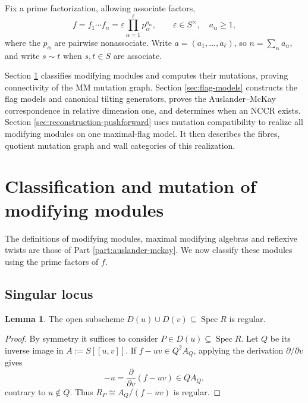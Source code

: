 \documentclass[a4paper,reqno]{amsart}
\DeclareMathOperator{\Spec}{Spec}
\theoremstyle{definition}
\newtheorem{Lem}[Thm]{Lemma}
\begin{document}
Fix a prime factorization, allowing associate factors,
\[
f=f_1\cdots f_n=\varepsilon\prod_{\alpha=1}^{\ell}p_\alpha^{a_\alpha},
\qquad \varepsilon\in S^\times,\quad a_\alpha\ge1,
\]
where the $p_\alpha$ are pairwise nonassociate. Write $a=(a_1,\ldots,a_\ell)$, so $n=\sum_\alpha a_\alpha$, and write $s\sim t$ when $s,t\in S$ are associate.

Section \ref{sec:modifying-modules} classifies modifying modules and computes their mutations, proving connectivity of the MM mutation graph. Section \ref{sec:flag-models} constructs the flag models and canonical tilting generators, proves the Auslander--McKay correspondence in relative dimension one, and determines when an NCCR exists. Section \ref{sec:reconstruction-pushforward} uses mutation compatibility to realize all modifying modules on one maximal-flag model. It then describes the fibres, quotient mutation graph and wall categories of this realization.

\section{Classification and mutation of modifying modules}\label{sec:modifying-modules}

The definitions of modifying modules, maximal modifying algebras and reflexive twists are those of Part \ref{part:auslander-mckay}. We now classify these modules using the prime factors of $f$.

\subsection{Singular locus}

\begin{Lem}\label{uvreg}
The open subscheme $D(u)\cup D(v)\subseteq\Spec R$ is regular.
\end{Lem}
\begin{proof}
By symmetry it suffices to consider $P\in D(u)\subseteq\Spec R$. Let $Q$ be its inverse image in $A:=S[[u,v]]$. If $f-uv\in Q^2A_Q$, applying the derivation $\partial/\partial v$ gives
\[
-u=\frac{\partial}{\partial v}(f-uv)\in QA_Q,
\]
contrary to $u\notin Q$. Thus $R_P\cong A_Q/(f-uv)$ is regular.
\end{proof}
\end{document}
